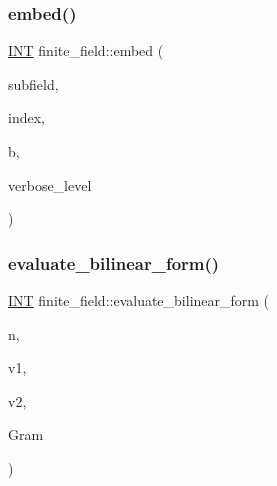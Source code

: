 \subsubsection{\texorpdfstring{embed()}{embed()}}
{\footnotesize\ttfamily \mbox{\hyperlink{galois_8h_a09fddde158a3a20bd2dcadb609de11dc}{I\+NT}} finite\+\_\+field\+::embed (\begin{DoxyParamCaption}\item[{\mbox{\hyperlink{classfinite__field}{finite\+\_\+field}} \&}]{subfield,  }\item[{\mbox{\hyperlink{galois_8h_a09fddde158a3a20bd2dcadb609de11dc}{I\+NT}}}]{index,  }\item[{\mbox{\hyperlink{galois_8h_a09fddde158a3a20bd2dcadb609de11dc}{I\+NT}}}]{b,  }\item[{\mbox{\hyperlink{galois_8h_a09fddde158a3a20bd2dcadb609de11dc}{I\+NT}}}]{verbose\+\_\+level }\end{DoxyParamCaption})}

\mbox{\label{classfinite__field_a3dac58d265759e3a5d7c53043d104986}} 
\subsubsection{\texorpdfstring{evaluate\+\_\+bilinear\+\_\+form()}{evaluate\_bilinear\_form()}}
{\footnotesize\ttfamily \mbox{\hyperlink{galois_8h_a09fddde158a3a20bd2dcadb609de11dc}{I\+NT}} finite\+\_\+field\+::evaluate\+\_\+bilinear\+\_\+form (\begin{DoxyParamCaption}\item[{\mbox{\hyperlink{galois_8h_a09fddde158a3a20bd2dcadb609de11dc}{I\+NT}}}]{n,  }\item[{\mbox{\hyperlink{galois_8h_a09fddde158a3a20bd2dcadb609de11dc}{I\+NT}} $\ast$}]{v1,  }\item[{\mbox{\hyperlink{galois_8h_a09fddde158a3a20bd2dcadb609de11dc}{I\+NT}} $\ast$}]{v2,  }\item[{\mbox{\hyperlink{galois_8h_a09fddde158a3a20bd2dcadb609de11dc}{I\+NT}} $\ast$}]{Gram }\end{DoxyParamCaption})}

\mbox{\label{classfinite__field_ad0d30daf0c7242c3a57226614d34522a}} 
